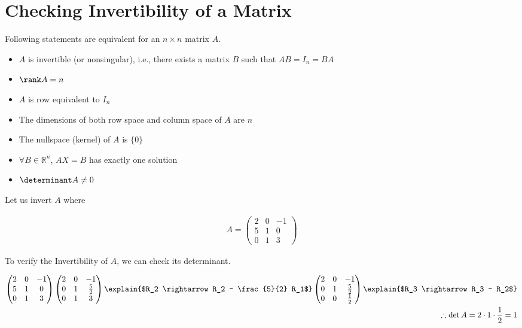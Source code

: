 \section{Checking Invertibility of a Matrix}

Following statements are equivalent for an $n \times n$ matrix $A$.

\begin{itemize}
  \item $A$ is invertible (or nonsingular), i.e., there exists a matrix $B$ such that $AB = I_n = BA$
  \item $\rank A = n$
  \item $A$ is row equivalent to $I_n$
  \item The dimensions of both row space and column space of $A$ are $n$
  \item The nullspace (kernel) of $A$ is $\{0\}$
  \item $\forall B \in \mathbb{R}^n$, $AX = B$ has exactly one solution
  \item $\determinant A \neq 0$
\end{itemize}

Let us invert $A$ where

\begin{align*}
  A =
  \begin{pmatrix}
    2 & 0 & -1\\
    5 & 1 &  0 \\
    0 & 1 &  3
  \end{pmatrix}
\end{align*}

To verify the Invertibility of $A$, we can check its determinant.

\begin{align*}
  \begin{pmatrix}
    2 & 0 & -1\\
    5 & 1 &  0 \\
    0 & 1 &  3
  \end{pmatrix}
  \begin{pmatrix}
    2 & 0 &           -1\\
    0 & 1 & \frac{5}{2} \\
    0 & 1 &           3
  \end{pmatrix}
  \explain{$R_2 \rightarrow R_2 - \frac{5}{2} R_1$}
  \begin{pmatrix}
    2 & 0 &           -1\\
    0 & 1 & \frac{5}{2} \\
    0 & 0 & \frac{1}{2}
  \end{pmatrix}
  \explain{$R_3 \rightarrow R_3 - R_2$}\\
  \therefore \det A = 2 \cdot 1 \cdot \frac{1}{2} = 1
\end{align*}

